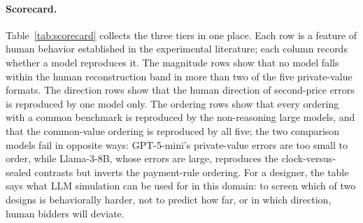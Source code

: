\documentclass[acmsmall,screen,review]{acmart}
\newcommand{\rev}[1]{{\color{blue}#1}}
\newcommand{\rev}[1]{#1}
\begin{document}
\begin{table}[htbp]
\centering
\small
\resizebox{\linewidth}{!}{}
\caption{Kendall's $\tau_b$ between the human and each model's SMAD ranking over the private-value formats, with joint 95\% bootstrap intervals over LLM bid resampling and human reconstruction re-draws ($B=2000$). \rev{Clock cells use uncensored LLM exit prices; for Claude, Gemini, and Llama they come from replacement models (Section~\ref{sec:models}), so these rows combine two model versions.}}
\label{tab:concordance}
\end{table}

\paragraph{Scorecard.}
Table~\ref{tab:scorecard} collects the three tiers in one place. Each row is a feature of human behavior established in the experimental literature; each column records whether a model reproduces it. The magnitude rows show that no model falls within the human reconstruction band in more than two of the five private-value formats. The direction rows show that the human direction of second-price errors is reproduced by one model only. The ordering rows show that every ordering with a common benchmark is reproduced by the non-reasoning large models, and that the common-value ordering is reproduced by all five; \rev{the two comparison models fail in opposite ways: GPT-5-mini's private-value errors are too small to order, while Llama-3-8B, whose errors are large, reproduces the clock-versus-sealed contrasts but inverts the payment-rule ordering.} For a designer, the table says what LLM simulation can be used for in this domain: to screen which of two designs is behaviorally harder, not to predict how far, or in which direction, human bidders will deviate.

\begin{table}[htbp]
\centering
\small
\resizebox{\linewidth}{!}{}
\caption{\textbf{Scorecard by tier.} Rows are features of human behavior; cells record whether a model reproduces them. Tier 1: SMAD inside (\checkmark) or outside ($\times$) the human 95\% reconstruction band, which the human column reports. Tiers 2 and 3: \checkmark reproduced, $\times$ not reproduced, $\approx$ uninformative because the cells sit at the theoretical benchmark; the human column gives the share of reconstruction re-draws in which the ordering holds where applicable. \rev{Blue cells were revised with the one-LLM clock design; $^{r}$: clock cell run with a replacement model (Section~\ref{sec:models}).} The last column counts the non-reasoning large models that reproduce the row, out of those with data.}
\label{tab:scorecard}
\end{table}
\end{document}

